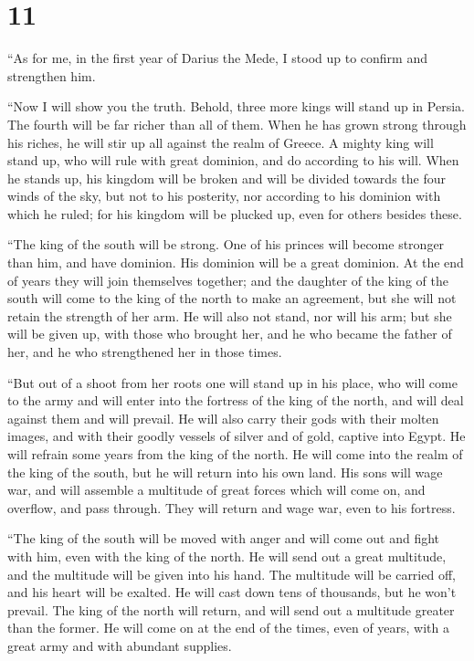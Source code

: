 \hypertarget{section-10}{%
\section{11}\label{section-10}}

 ``As for me, in the first year of Darius the Mede, I
stood up to confirm and strengthen him.

 ``Now I will show you the truth. Behold, three more kings
will stand up in Persia. The fourth will be far richer than all of them.
When he has grown strong through his riches, he will stir up all against
the realm of Greece.  A mighty king will stand up, who
will rule with great dominion, and do according to his will.
 When he stands up, his kingdom will be broken and will be
divided towards the four winds of the sky, but not to his posterity, nor
according to his dominion with which he ruled; for his kingdom will be
plucked up, even for others besides these.

 ``The king of the south will be strong. One of his
princes will become stronger than him, and have dominion. His dominion
will be a great dominion.  At the end of years they will
join themselves together; and the daughter of the king of the south will
come to the king of the north to make an agreement, but she will not
retain the strength of her arm. He will also not stand, nor will his
arm; but she will be given up, with those who brought her, and he who
became the father of her, and he who strengthened her in those times.

 ``But out of a shoot from her roots one will stand up in
his place, who will come to the army and will enter into the fortress of
the king of the north, and will deal against them and will prevail.
 He will also carry their gods with their molten images,
and with their goodly vessels of silver and of gold, captive into Egypt.
He will refrain some years from the king of the north.  He
will come into the realm of the king of the south, but he will return
into his own land.  His sons will wage war, and will
assemble a multitude of great forces which will come on, and overflow,
and pass through. They will return and wage war, even to his fortress.

 ``The king of the south will be moved with anger and
will come out and fight with him, even with the king of the north. He
will send out a great multitude, and the multitude will be given into
his hand.  The multitude will be carried off, and his
heart will be exalted. He will cast down tens of thousands, but he won't
prevail.  The king of the north will return, and will
send out a multitude greater than the former. He will come on at the end
of the times, even of years, with a great army and with abundant
supplies.

